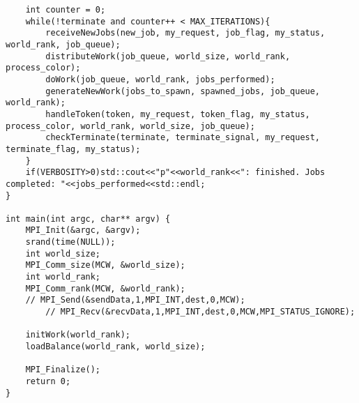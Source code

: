 \documentclass[12pt]{article}
\begin{document}
\begin{verbatim}
	int counter = 0;
	while(!terminate and counter++ < MAX_ITERATIONS){
		receiveNewJobs(new_job, my_request, job_flag, my_status, world_rank, job_queue);
		distributeWork(job_queue, world_size, world_rank, process_color);
		doWork(job_queue, world_rank, jobs_performed);
		generateNewWork(jobs_to_spawn, spawned_jobs, job_queue, world_rank);
		handleToken(token, my_request, token_flag, my_status, process_color, world_rank, world_size, job_queue);
		checkTerminate(terminate, terminate_signal, my_request, terminate_flag, my_status);
	}
	if(VERBOSITY>0)std::cout<<"p"<<world_rank<<": finished. Jobs completed: "<<jobs_performed<<std::endl;
}

int main(int argc, char** argv) {
	MPI_Init(&argc, &argv);
	srand(time(NULL));
	int world_size;
	MPI_Comm_size(MCW, &world_size);
	int world_rank;
	MPI_Comm_rank(MCW, &world_rank);
	// MPI_Send(&sendData,1,MPI_INT,dest,0,MCW);
        // MPI_Recv(&recvData,1,MPI_INT,dest,0,MCW,MPI_STATUS_IGNORE);

	initWork(world_rank);
	loadBalance(world_rank, world_size);

	MPI_Finalize();
	return 0;
}

\end{verbatim}
\end{document}
